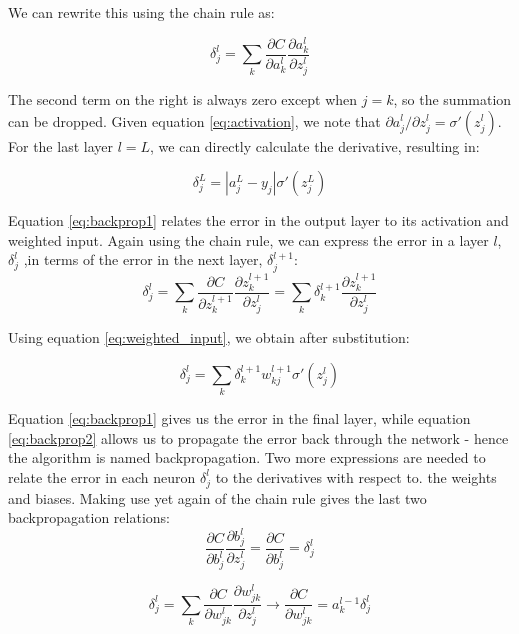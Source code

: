 \documentclass{Dissertate}
\begin{document}
We can rewrite this using the chain rule as:

\[
\delta^l_j = \sum_k \frac{\partial C}{\partial a^l_{k}}\frac{\partial a^l_{k}}{\partial z^l_{j}}
\]

The second term on the right is always zero except when \(j=k\), so the
summation can be dropped. Given equation \ref{eq:activation}, we
note that \(\partial a^l_{j}/\partial z^l_{j} = \sigma'(z^l_j)\). For
the last layer \(l = L\), we can directly calculate the derivative,
resulting in:

\begin{equation}
\delta^L_j =  |a^L_j-y_j|\sigma'(z^L_j)
\label{eq:backprop1}\end{equation}

Equation \ref{eq:backprop1} relates the error in the output layer to
its activation and weighted input. Again using the chain rule, we can
express the error in a layer \(l\), \(\delta^{l}_j\) ,in terms of the
error in the next layer, \(\delta^{l+1}_j\): \[
\delta^l_j = \sum_k \frac{\partial C}{\partial z^{l+1}_{k}}\frac{\partial z^{l+1}_{k}}{\partial z^l_{j}} = \sum_k \delta^{l+1}_k\frac{\partial z^{l+1}_{k}}{\partial z^l_{j}}
\]

Using equation \ref{eq:weighted_input}, we obtain after
substitution:

\begin{equation}
\delta^l_j = \sum_k\delta^{l+1}_kw^{l+1}_{kj}\sigma'(z^l_j)
\label{eq:backprop2}\end{equation}

Equation \ref{eq:backprop1} gives us the error in the final layer,
while equation \ref{eq:backprop2} allows us to propagate the error
back through the network - hence the algorithm is named backpropagation.
Two more expressions are needed to relate the error in each neuron
\(\delta^l_j\) to the derivatives with respect to. the weights and biases. Making
use yet again of the chain rule gives the last two backpropagation
relations: \begin{equation}
\frac{\partial C}{\partial b^l_{j}}\frac{\partial b^l_{j}}{\partial z^l_{j}}=\frac{\partial C}{\partial b^l_{j}}=\delta^l_j
\label{eq:backprop3}\end{equation}

\begin{equation}
\delta^l_j=\sum_k\frac{\partial C}{\partial w^l_{jk}}\frac{\partial w^l_{jk}}{\partial z^l_{j}}\to \frac{\partial C}{\partial w^l_{jk}}=a^{l-1}_{k}\delta^l_j
\label{eq:backprop4}\end{equation}
\end{document}
